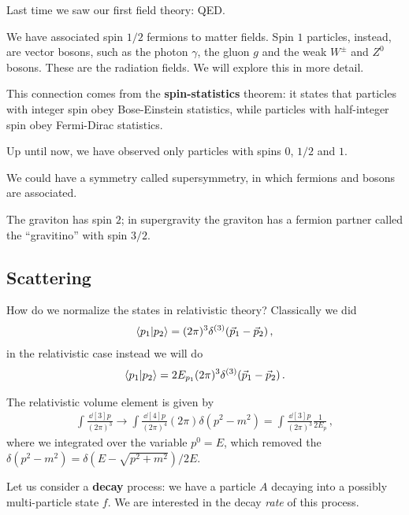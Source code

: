 \documentclass[main.tex]{subfiles}
\begin{document}

Last time we saw our first field theory: QED. 

We have associated spin \(1/2\) fermions to matter fields. 
Spin \(1\) particles, instead, are vector bosons, such as the photon \(\gamma\), the gluon \(g\) and the weak \(W^{\pm}\) and \(Z^{0}\) bosons. These are the radiation fields.  
We will explore this in more detail. 

This connection comes from the \textbf{spin-statistics} theorem: it states that particles with integer spin obey Bose-Einstein statistics, while particles with half-integer spin obey Fermi-Dirac statistics.

Up until now, we have observed only particles with spins \(0\), \(1/2\) and \(1\). 

We could have a symmetry called supersymmetry, in which fermions and bosons are associated. 

The graviton has spin \(2\); in supergravity the graviton has a fermion partner called the ``gravitino'' with spin \(3/2\). 

\subsection{Scattering}

How do we normalize the states in relativistic theory? 
Classically we did 
%
\begin{align}
\braket{p_1 }{p_2  } = (2 \pi )^3 \delta^{(3)} (\vec{p}_{1} - \vec{p}_{2})
\,,
\end{align}
%
in the relativistic case instead we will do 
%
\begin{align}
\braket{p_1 }{p_2  } = 2 E_{p_1 } (2 \pi )^3 \delta^{(3)} (\vec{p}_{1} - \vec{p}_{2})
\,.
\end{align}

The relativistic volume element is given by 
%
\begin{align}
\int \frac{ \dd[3]{p}}{(2\pi )^3} \rightarrow
\int \frac{ \dd[4]{p}}{(2 \pi )^{4}} (2 \pi ) \delta (p^2-m^2)
= \int \frac{ \dd[3]{p}}{(2\pi )^3} \frac{1}{2E_p}
\,,
\end{align}
%
where we integrated over the variable \(p^{0}=E\), which removed the \(\delta (p^2-m^2) = \delta (E - \sqrt{p^2+m^2}) / 2E\). 

Let us consider a \textbf{decay} process: we have a particle \(A\) decaying into a possibly multi-particle state \(f\). 
We are interested in the decay \emph{rate} of this process. 
\end{document}
